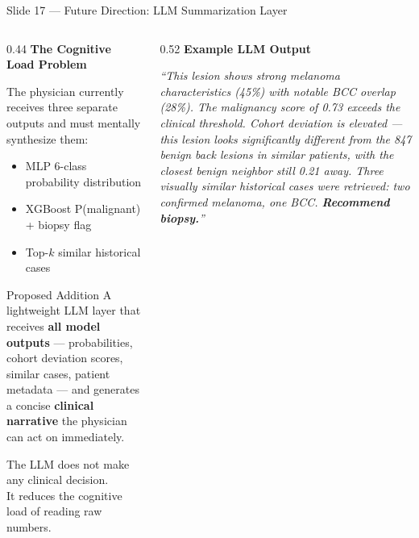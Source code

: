 \documentclass[aspectratio=169, 9pt]{beamer}
\begin{document}
\begin{frame}{Slide 17 --- Future Direction: LLM Summarization Layer}

  \begin{columns}[T]

    \begin{column}{0.44\textwidth}
      \textbf{\color{navyblue}The Cognitive Load Problem}

      \vspace{0.3em}
      {\small
      The physician currently receives three separate outputs
      and must mentally synthesize them:
      \begin{itemize}[leftmargin=1em, itemsep=2pt]
        \item MLP 6-class probability distribution
        \item XGBoost P(malignant) + biopsy flag
        \item Top-$k$ similar historical cases
      \end{itemize}
      }

      \vspace{0.4em}
      \begin{block}{Proposed Addition}
        \small
        A lightweight LLM layer that receives \textbf{all model
        outputs} --- probabilities, cohort deviation scores,
        similar cases, patient metadata --- and generates a
        concise \textbf{clinical narrative} the physician can
        act on immediately.
      \end{block}

      \vspace{0.3em}
      {\scriptsize\color{gray}
      The LLM does not make any clinical decision.\\
      It reduces the cognitive load of reading raw numbers.}
    \end{column}

    \begin{column}{0.52\textwidth}
      \textbf{\color{navyblue}Example LLM Output}

      \vspace{0.3em}
      \begin{exampleblock}{}
        \scriptsize
        \textit{``This lesion shows strong melanoma
        characteristics (45\%) with notable BCC overlap (28\%).
        The malignancy score of 0.73 exceeds the clinical
        threshold. Cohort deviation is elevated --- this lesion
        looks significantly different from the 847 benign back
        lesions in similar patients, with the closest benign
        neighbor still 0.21 away. Three visually similar
        historical cases were retrieved: two confirmed melanoma,
        one BCC. \textbf{Recommend biopsy.}''}
      \end{exampleblock}


\end{column}
\end{columns}
\end{frame}
\end{document}
